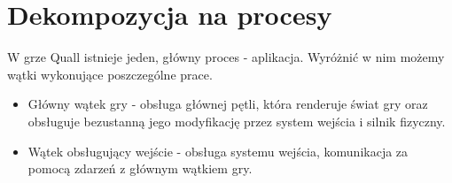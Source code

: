 \documentclass[12pt,a4paper,twoside]{article}
\begin{document}
\section{Dekompozycja na procesy}


W grze Quall istnieje jeden, główny proces - aplikacja. Wyróżnić w nim możemy wątki wykonujące poszczególne prace.

\begin{itemize}
\item Główny wątek gry - obsługa głównej pętli, która renderuje świat gry oraz obsługuje bezustanną jego modyfikację przez system wejścia i silnik fizyczny.
\item Wątek obsługujący wejście - obsługa systemu wejścia, komunikacja za pomocą zdarzeń z głównym wątkiem gry.
\end{itemize}




\end{document}
